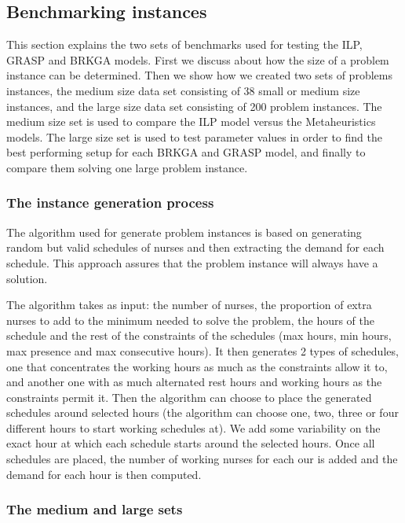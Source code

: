 \subsection{Benchmarking instances}

This section explains the two sets of benchmarks used for testing the ILP, GRASP and BRKGA models. First we discuss about how the size of a problem instance can be determined. Then we show how we created two sets of problems instances, the medium size data set consisting of 38 small or medium size instances, and the large size data set consisting of 200 problem instances. The medium size set is used to compare the ILP model versus the Metaheuristics models. The large size set is used to test parameter values in order to find the best performing setup for each BRKGA and GRASP model, and finally to compare them solving one large problem instance.


\subsubsection{The instance generation process}

The algorithm used for generate problem instances is based on generating random but valid schedules of nurses and then extracting the demand for each schedule. This approach assures that the problem instance will always have a solution.

The algorithm takes as input: the number of nurses, the proportion of extra nurses to add to the minimum needed to solve the problem, the hours of the schedule and the rest of the constraints of the schedules (max hours, min hours, max presence and max consecutive hours). It then generates 2 types of schedules, one that concentrates the working hours as much as the constraints allow it to, and another one with as much alternated rest hours and working hours as the constraints permit it. Then the algorithm can choose to place the generated schedules around selected hours (the algorithm can choose one, two, three or four different hours to start working schedules at). We add some variability on the exact hour at which each schedule starts around the selected hours. Once all schedules are placed, the number of working nurses for each our is added and the demand for each hour is then computed.


\subsubsection{The medium and large sets}

